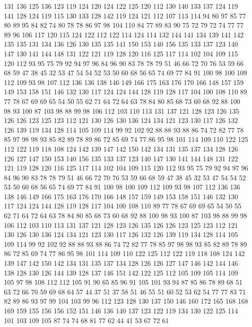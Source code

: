 131 136 125 136 123 119 124 120 124 122 125 120 112 130 140 133 137 124 119 141
128 124 119 115 130 133 128 142 119 124 121 112 107 113 114 94 80 97 85 77
80 89 95 84 82 74 80 78 78 86 97 98 104 110 84 77 89 83 90 75
72 79 72 74 77 77 89 96 106 117 120 115 124 122 112 122 114 124 114 132
144 141 134 139 141 142 135 135 131 134 136 126 130 135 135 141 150 153 140 156
135 133 137 123 140 147 130 141 144 148 131 122 121 119 128 120 116 125 117 114
102 104 109 115 120 112 93 95 75 79 92 94 97 96 84 96 90 83 78 78
79 51 46 66 72 70 76 53 59 66 68 59 47 38 45 32 53 47 54 54
52 53 50 60 68 56 65 74 69 77 84 91 100 98 100 109 112 109 93 98
107 112 136 136 138 146 149 166 175 163 176 170 166 148 157 159 149 153 158 151
146 132 130 117 124 124 144 128 119 128 117 104 100 108 110 89 77 78 67 69
69 65 54 50 55 62 71 64 72 64 63 78 84 80 85 68 73 60 68 92
88 100 98 93 100 87 103 98 88 99 98 106 112 103 110 113 131 137 121 128
123 126 135 126 126 123 125 123 112 121 130 126 130 136 124 134 121 123 130 117
126 132 126 139 119 134 128 114 105 109 114 99 92 102 92 88 88 93 88 86
74 72 82 77 78 85 97 98 98 93 85 82 89 78 89 86 72 85 69 74
77 86 95 98 101 114 109 110 122 125 112 122 119 118 108 124 142 139 147 142
150 142 134 131 135 137 134 128 126 126 127 147 150 153 140 156 135 133 137 123
140 147 130 141 144 148 131 122 121 119 128 120 116 125 117 114 102 104 109 115
120 112 93 95 75 79 92 94 97 96 84 96 90 83 78 78 79 51 46 66
72 70 76 53 59 66 68 59 47 38 45 32 53 47 54 54 52 53 50 60
68 56 65 74 69 77 84 91 100 98 100 109 112 109 93 98 107 112 136 136
138 146 149 166 175 163 176 170 166 148 157 159 149 153 158 151 146 132 130 117
124 124 144 128 119 128 117 104 100 108 110 89 77 78 67 69 69 65 54 50
55 62 71 64 72 64 63 78 84 80 85 68 73 60 68 92 88 100 98 93
100 87 103 98 88 99 98 106 112 103 110 113 131 137 121 128 123 126 135 126
126 123 125 123 112 121 130 126 130 136 124 134 121 123 130 117 126 132 126 139
119 134 128 114 105 109 114 99 92 102 92 88 88 93 88 86 74 72 82 77
78 85 97 98 98 93 85 82 89 78 89 86 72 85 69 74 77 86 95 98
101 114 109 110 122 125 112 122 119 118 108 124 142 139 147 142 150 142 134 131
135 137 134 128 126 126 127 147 146 142 144 146 138 128 130 126 144 139 128 137
146 151 142 122 125 112 105 109 105 114 109 105 97 98 108 112 112 105 91 90
65 85 96 91 105 101 93 94 87 85 86 78 89 68 51 63 72 66 70 59
69 68 64 57 44 37 51 37 58 51 46 55 51 60 52 53 62 54 77 77
83 71 82 89 86 93 97 99 104 103 99 96 112 123 128 130 137 150 146 160
172 165 168 168 169 159 155 156 156 152 151 146 136 140 137 123 122 119 134 130
122 125 114 101 103 109 105 87 74 74 68 81 77 62 44 41 53 67 72 61
